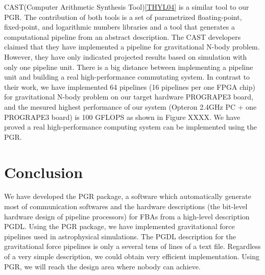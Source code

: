 \documentclass[times, 10pt,twocolumn]{article}
\begin{document}
CAST(Computer Arithmetic Synthesis Tool)\ref{THYL04} is a similar tool
to our PGR.  The contribution of both tools is a set of parametrized
floating-point, fixed-point, and logarithmic numbers libraries and a
tool that generates a computational pipeline from an abstract description.
The CAST developers claimed that they have implemented
a pipeline for gravitational N-body problem. 
However, they have only indicated 
projected results based on simulation with only one pipeline unit.
There is a big distance between implementing a pipeline unit and building a real
high-performance commutating system. In contrast to their work,
we have implemented 64 pipelines (16 pipelines per one FPGA chip)
for gravitational N-body problem on our target hardware PROGRAPE3 board,
and the mesured highest performance of our system
(Opteron 2.4GHz PC + one PROGRAPE3 board) is 100 GFLOPS as shown in Figure XXXX.
We have proved a real high-performance computing system
can be implemented using the PGR.


\section{Conclusion}
We have developed the PGR package, a software which automatically generate
most of communication softwares and the hardware descriptions
(the bit-level hardware design of pipeline processors)
for FBAs from a high-level description PGDL.
Using the PGR package, we have implemented gravitational force
pipelines used in astrophysical simulations.
The PGDL description for the gravitational force pipelines
is only a several tens of lines of a text file.
Regardless of a very simple description, we could obtain very
efficient implementation. 
Using PGR, we will reach the design area where nobody can achieve.
\end{document}
